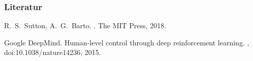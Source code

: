 \documentclass{beamer}
\begin{document}
\appendix

\begin{frame}[allowframebreaks]
  \frametitle<presentation>{Literatur}
    
  \begin{thebibliography}{10}
    
  \beamertemplatebookbibitems

    R.~S.~Sutton, A.~G.~Barto.
    .
    \newblock The MIT Press, 2018.
 
    
  \beamertemplatearticlebibitems

    Google DeepMind.
    \newblock Human-level control through deep reinforcement learning.
    , doi:10.1038/nature14236,
    2015.
  \end{thebibliography}
\end{frame}
\end{document}
